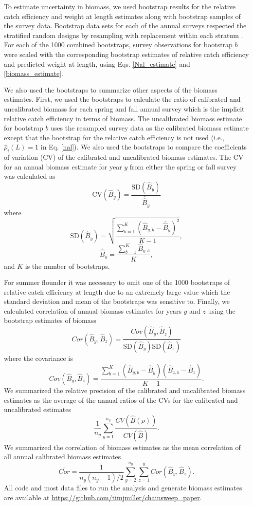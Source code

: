 \documentclass[
  12pt,
]{article}
\begin{document}
To estimate uncertainty in biomass, we used bootstrap results for the
relative catch efficiency and weight at length estimates along with
bootstrap samples of the survey data. Bootstrap data sets for each of
the annual surveys respected the stratified random designs by resampling
with replacement within each stratum \citep{smith97}. For each of the
1000 combined bootstraps, survey observations for bootstrap \(b\) were
scaled with the corresponding bootstrap estimates of relative catch
efficiency and predicted weight at length, using Eqs. \ref{Nal_estimate}
and \ref{biomass_estimate}.

We also used the bootstraps to summarize other aspects of the biomass
estimates. First, we used the bootstraps to calculate the ratio of
calibrated and uncalibrated biomass for each spring and fall annual
survey which is the implicit relative catch efficiency in terms of
biomass. The uncalibrated biomass estimate for bootstrap \(b\) uses the
resampled survey data as the calibrated biomass estimate except that the
bootstrap for the relative catch efficiency is not used (i.e.,
\(\widehat \rho_i\left(L\right) = 1\) in Eq. \ref{nal}). We also used
the bootstraps to compare the coefficients of variation (CV) of the
calibrated and uncalibrated biomass estimates. The CV for an annual
biomass estimate for year \(y\) from either the spring or fall survey
was calculated as \[
\text{CV}\left(\widehat B_y\right) = \frac{\text{SD}\left(\widehat B_y\right)}{\overline{\widehat B}_y}
\] where \[
\text{SD}\left(\widehat B_y\right) = \sqrt{\frac{\sum_{b=1}^K \left(\widehat B_{y,b} - \overline{\widehat B}_y\right)^2}{K-1}},
\] \[
\overline{\widehat B}_y = \frac{\sum_{b=1}^K \widehat B_{y,b}}{K},
\] and \(K\) is the number of bootstraps.

For summer flounder it was necessary to omit one of the 1000 bootstraps
of relative catch efficiency at length due to an extremely large value
which the standard deviation and mean of the bootstraps was sensitive
to. Finally, we calculated correlation of annual biomass estimates for
years \(y\) and \(z\) using the bootstrap estimates of biomass \[
Cor\left(\widehat B_y, \widehat B_z\right) = \frac{Cov\left(\widehat B_y, \widehat B_z\right)}{\text{SD}\left(\widehat B_y\right)\text{SD}\left(\widehat B_z\right)}
\] where the covariance is \[
Cov\left(\widehat B_y, \widehat B_z\right) = \frac{\sum_{b=1}^K \left(\widehat B_{y,b} - \overline{\widehat B}_y\right)\left(\widehat B_{z,b} - \overline{\widehat B}_z\right)}{K-1}.
\] We summarized the relative precision of the calibrated and
uncalibrated biomass estimates as the average of the annual ratios of
the CVs for the calibrated and uncalibrated estimates \[
\frac{1}{n_y} \sum^{n_y}_{y = 1}\frac{CV\left(\widehat B\left(\rho\right)\right)}{CV\left(\widehat B\right)}.
\] We summarized the correlation of biomass estimates as the mean
correlation of all annual calibrated biomass estimates \[
\overline {Cor} = \frac{1}{n_y(n_y-1)/2} \sum_{y=2}^{n_y} \sum_{z=1}^{y} Cor\left(\widehat B_y, \widehat B_z\right).
\] All code and most data files to run the analysis and generate biomass
estimates are available at
\url{https://github.com/timjmiller/chainsweep_paper}.
\end{document}
